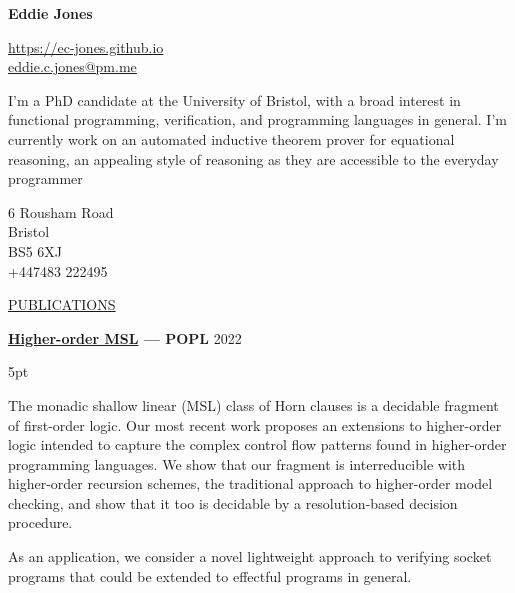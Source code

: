 \documentclass{article}
\newenvironment{tight-list}[1]{
  \vspace{5pt}
  \begin{adjustwidth}{15pt}{0pt}
  \begin{itemize}
    \setlength{\itemsep}{#1}
    \setlength{\parskip}{0pt}
    \setlength{\parsep}{0pt} 
}
{
  \end{itemize}
  \end{adjustwidth}
  \vspace{15pt}
}
\begin{document}
\begin{minipage}[t]{0.7\textwidth}
  \raggedright{}
  {\LARGE\textbf{Eddie Jones}}
  \vspace{10pt}

  \href{https://ec-jones.github.io}{https://ec-jones.github.io}\\
  \href{mailto:eddie.c.jones@pm.me}{eddie.c.jones@pm.me}

  \vspace{15pt}
  I'm a PhD candidate at the University of Bristol, with a broad interest in functional programming, verification, and programming languages in general.
  I'm currently work on an automated inductive theorem prover for equational reasoning, an appealing style of reasoning as they are accessible to the everyday programmer
\end{minipage}
\begin{minipage}[t]{0.25\textwidth}
  \raggedleft{}
  \vspace{15pt}
  6 Rousham Road\\
  Bristol\\
  BS5 6XJ\\
  +447483 222495
\end{minipage}

\vspace{20pt}

\uline{{\large PUBLICATIONS}\hfill}

\vspace{10pt}

\textbf{\href{https://arxiv.org/abs/2210.14649}{Higher-order MSL} --- POPL} \hfill 2022
\begin{tight-list}{5pt}
\item The monadic shallow linear (MSL) class of Horn clauses is a decidable fragment of first-order logic. Our most recent work proposes an extensions to higher-order logic intended to capture the complex control flow patterns found in higher-order programming languages. We show that our fragment is interreducible with higher-order recursion schemes, the traditional approach to higher-order model checking, and show that it too is decidable by a resolution-based decision procedure.
\item As an application, we consider a novel lightweight approach to verifying socket programs that could be extended to effectful programs in general. 
\end{tight-list}
\end{document}
